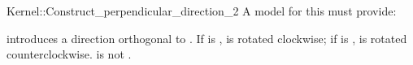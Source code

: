 \begin{ccRefFunctionObjectConcept}{Kernel::Construct_perpendicular_direction_2}
A model for this must provide:


            {introduces a direction orthogonal to . If  is
             ,  is rotated clockwise; if  is
             ,  is rotated counterclockwise.
             \ccPrecond {} is not .}

\ccIsModel{}

\end{ccRefFunctionObjectConcept}
